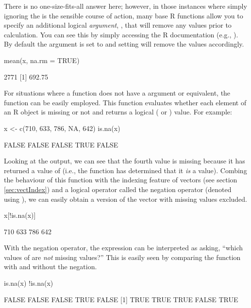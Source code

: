 There is no one-size-fits-all answer here; however, in those instances where simply ignoring the  is the sensible course of action, many base R functions allow you to specify an additional logical \textit{argument}, , that will remove any  values prior to calculation. You can see this by simply accessing the R documentation (e.g., ). By default the argument is set to  and setting  will remove the  values accordingly.

\begin{inR}
mean(x, na.rm = TRUE)
\end{inR}
\begin{outR}
[1] 2771
[1] 692.75
\end{outR}

For situations where a function does not have a  argument or equivalent, the function  can be easily employed. This function evaluates whether each element of an R object is missing or not and returns a logical ( or ) value. For example:

\begin{inR}
x <- c(710, 633, 786, NA, 642)
is.na(x)
\end{inR}
\begin{outR}
[1] FALSE FALSE FALSE TRUE FALSE
\end{outR}

Looking at the output, we can see that the fourth value is missing because it has returned a value of  (i.e., the function has determined that it \textit{is} a  value).  Combing the behaviour of this function with the indexing feature of vectors (see section \ref{sec:vectIndex}) and a \gls{logical operator} called the \gls{negation operator} (denoted using \R{!}), we can easily obtain a version of the vector with missing values excluded.

\begin{inR}
x[!is.na(x)]
\end{inR}
\begin{outR}
[1] 710 633 786 642
\end{outR}

With the negation operator, the expression  can be interpreted as asking, ``which values of  are \textit{not} missing values?''  This is easily seen by comparing the  function with and without the negation.

\begin{inR}
is.na(x)
!is.na(x)
\end{inR}
\begin{outR}
[1] FALSE FALSE FALSE  TRUE FALSE
[1]  TRUE  TRUE  TRUE FALSE  TRUE
\end{outR}

